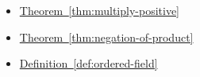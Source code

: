 \begin{dependencies}
\begin{itemize}
  \item \hyperref[thm:multiply-positive]{Theorem~\ref*{thm:multiply-positive}}
  \item \hyperref[thm:negation-of-product]{Theorem~\ref*{thm:negation-of-product}}
  \item \hyperref[def:ordered-field]{Definition~\ref*{def:ordered-field}}
\end{itemize}
\end{dependencies}

\clearpage
